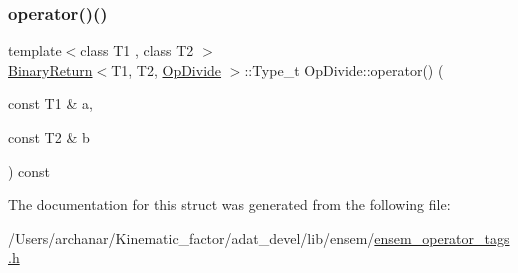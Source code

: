 \mbox{\label{structOpDivide_ae41ed8850cb38437e1b709a890e2fd79}} 
\subsubsection{\texorpdfstring{operator()()}{operator()()}\hspace{0.1cm}{\footnotesize\ttfamily [2/2]}}
{\footnotesize\ttfamily template$<$class T1 , class T2 $>$ \\
\mbox{\hyperlink{structBinaryReturn}{Binary\+Return}}$<$T1, T2, \mbox{\hyperlink{structOpDivide}{Op\+Divide}} $>$\+::Type\+\_\+t Op\+Divide\+::operator() (\begin{DoxyParamCaption}\item[{const T1 \&}]{a,  }\item[{const T2 \&}]{b }\end{DoxyParamCaption}) const\hspace{0.3cm}{\ttfamily [inline]}}



The documentation for this struct was generated from the following file\+:\begin{DoxyCompactItemize}
\item 
/\+Users/archanar/\+Kinematic\+\_\+factor/adat\+\_\+devel/lib/ensem/\mbox{\hyperlink{lib_2ensem_2ensem__operator__tags_8h}{ensem\+\_\+operator\+\_\+tags.\+h}}\end{DoxyCompactItemize}
